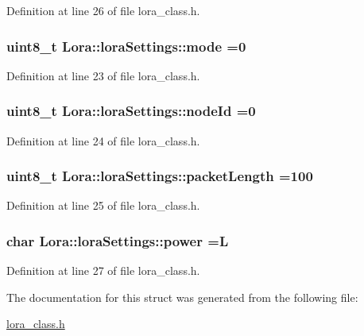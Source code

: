 Definition at line 26 of file lora\+\_\+class.\+h.

\subsubsection[{\texorpdfstring{mode}{mode}}]{\setlength{\rightskip}{0pt plus 5cm}uint8\+\_\+t Lora\+::lora\+Settings\+::mode =0}\hypertarget{struct_lora_1_1lora_settings_ab190860612308c8827e1e8825e33ce0c}{}\label{struct_lora_1_1lora_settings_ab190860612308c8827e1e8825e33ce0c}


Definition at line 23 of file lora\+\_\+class.\+h.

\subsubsection[{\texorpdfstring{node\+Id}{nodeId}}]{\setlength{\rightskip}{0pt plus 5cm}uint8\+\_\+t Lora\+::lora\+Settings\+::node\+Id =0}\hypertarget{struct_lora_1_1lora_settings_af3be9bceb1775ed3791c5fbfe3362983}{}\label{struct_lora_1_1lora_settings_af3be9bceb1775ed3791c5fbfe3362983}


Definition at line 24 of file lora\+\_\+class.\+h.

\subsubsection[{\texorpdfstring{packet\+Length}{packetLength}}]{\setlength{\rightskip}{0pt plus 5cm}uint8\+\_\+t Lora\+::lora\+Settings\+::packet\+Length =100}\hypertarget{struct_lora_1_1lora_settings_af0a81f87a3cca6265b4d03c795f995de}{}\label{struct_lora_1_1lora_settings_af0a81f87a3cca6265b4d03c795f995de}


Definition at line 25 of file lora\+\_\+class.\+h.

\subsubsection[{\texorpdfstring{power}{power}}]{\setlength{\rightskip}{0pt plus 5cm}char Lora\+::lora\+Settings\+::power =\textquotesingle{}L\textquotesingle{}}\hypertarget{struct_lora_1_1lora_settings_aeb2cbc4b48b9678e06ca0f6dab172726}{}\label{struct_lora_1_1lora_settings_aeb2cbc4b48b9678e06ca0f6dab172726}


Definition at line 27 of file lora\+\_\+class.\+h.



The documentation for this struct was generated from the following file\+:\begin{DoxyCompactItemize}
\item 
\hyperlink{lora__class_8h}{lora\+\_\+class.\+h}\end{DoxyCompactItemize}

